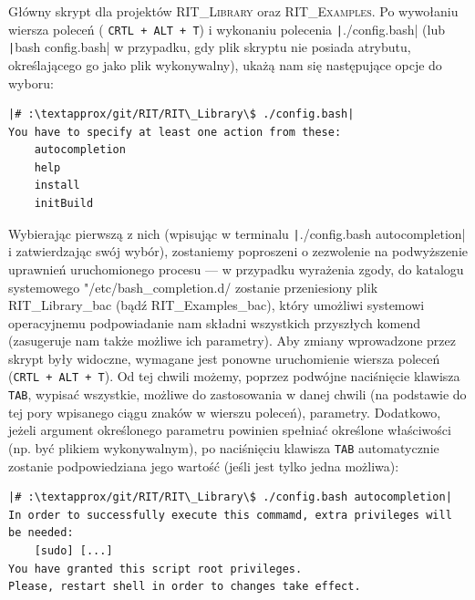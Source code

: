 
Główny skrypt dla projektów \textsc{RIT\_Library} oraz \textsc{RIT\_Examples}. Po wywołaniu wiersza poleceń ( \texttt{CRTL + ALT + T}) i wykonaniu polecenia \texttt|./config.bash| (lub \texttt|bash config.bash| w przypadku, gdy plik skryptu nie posiada atrybutu, określającego go jako plik wykonywalny), ukażą nam się następujące opcje do wyboru:

\begin{verbatim}
|# :\textapprox/git/RIT/RIT\_Library\$ ./config.bash|
You have to specify at least one action from these:
	autocompletion
	help
	install
	initBuild
\end{verbatim}

Wybierając pierwszą z nich (wpisując w terminalu \texttt|./config.bash autocompletion| i zatwierdzając swój wybór), zostaniemy poproszeni o zezwolenie na podwyższenie uprawnień uruchomionego procesu --- w przypadku wyrażenia zgody, do katalogu systemowego \textsf{"/etc/bash\_completion.d/} zostanie przeniesiony plik \textsf{RIT\_Library\_bac} (bądź \textsf{RIT\_Examples\_bac}), który umożliwi systemowi operacyjnemu podpowiadanie nam składni wszystkich przyszłych komend (zasugeruje nam także możliwe ich parametry). Aby zmiany wprowadzone przez skrypt były widoczne, wymagane jest ponowne uruchomienie wiersza poleceń (\texttt{CRTL + ALT + T}). Od tej chwili możemy, poprzez podwójne naciśnięcie klawisza \texttt{TAB}, wypisać wszystkie, możliwe do zastosowania w danej chwili (na podstawie do tej pory wpisanego ciągu znaków w wierszu poleceń), parametry. Dodatkowo, jeżeli argument określonego parametru powinien spełniać określone właściwości (np. być plikiem wykonywalnym), po naciśnięciu klawisza \texttt{TAB} automatycznie zostanie podpowiedziana jego wartość (jeśli jest tylko jedna możliwa):

\begin{verbatim}
|# :\textapprox/git/RIT/RIT\_Library\$ ./config.bash autocompletion|
In order to successfully execute this commamd, extra privileges will be needed:
	[sudo] [...]
You have granted this script root privileges.
Please, restart shell in order to changes take effect.
\end{verbatim}

